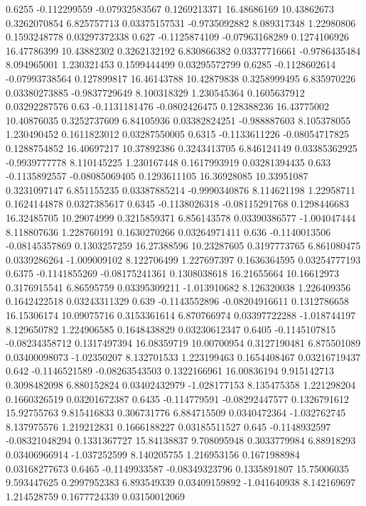 {0.6255 -0.112299559 -0.07932583567 0.1269213371 16.48686169 10.43862673 0.3262070854 6.825757713 0.03375157531 -0.9735092882 8.089317348 1.22980806 0.1593248778 0.03297372338
0.627 -0.1125874109 -0.07963168289 0.1274106926 16.47786399 10.43882302 0.3262132192 6.830866382 0.03377716661 -0.9786435484 8.094965001 1.230321453 0.1599444499 0.03295572799
0.6285 -0.1128602614 -0.07993738564 0.127899817 16.46143788 10.42879838 0.3258999495 6.835970226 0.03380273885 -0.9837729649 8.100318329 1.230545364 0.1605637912 0.03292287576
0.63 -0.1131181476 -0.0802426475 0.128388236 16.43775002 10.40876035 0.3252737609 6.84105936 0.03382824251 -0.988887603 8.105378055 1.230490452 0.1611823012 0.03287550005
0.6315 -0.1133611226 -0.08054717825 0.1288754852 16.40697217 10.37892386 0.3243413705 6.846124149 0.03385362925 -0.9939777778 8.110145225 1.230167448 0.1617993919 0.03281394435
0.633 -0.1135892557 -0.08085069405 0.1293611105 16.36928085 10.33951087 0.3231097147 6.851155235 0.03387885214 -0.9990340876 8.114621198 1.22958711 0.1624144878 0.0327385617
0.6345 -0.1138026318 -0.08115291768 0.1298446683 16.32485705 10.29074999 0.3215859371 6.856143578 0.03390386577 -1.004047444 8.118807636 1.228760191 0.1630270266 0.03264971411
0.636 -0.1140013506 -0.08145357869 0.1303257259 16.27388596 10.23287605 0.3197773765 6.861080475 0.0339286264 -1.009009102 8.122706499 1.227697397 0.1636364595 0.03254777193
0.6375 -0.1141855269 -0.08175241361 0.1308038618 16.21655664 10.16612973 0.3176915541 6.86595759 0.03395309211 -1.013910682 8.126320038 1.226409356 0.1642422518 0.03243311329
0.639 -0.1143552896 -0.08204916611 0.1312786658 16.15306174 10.09075716 0.3153361614 6.870766974 0.03397722288 -1.018744197 8.129650782 1.224906585 0.1648438829 0.03230612347
0.6405 -0.1145107815 -0.08234358712 0.1317497394 16.08359719 10.00700954 0.3127190481 6.875501089 0.03400098073 -1.02350207 8.132701533 1.223199463 0.1654408467 0.03216719437
0.642 -0.1146521589 -0.08263543503 0.1322166961 16.00836194 9.915142713 0.3098482098 6.880152824 0.03402432979 -1.028177153 8.135475358 1.221298204 0.1660326519 0.03201672387
0.6435 -0.114779591 -0.08292447577 0.1326791612 15.92755763 9.815416833 0.306731776 6.884715509 0.0340472364 -1.032762745 8.137975576 1.219212831 0.1666188227 0.03185511527
0.645 -0.1148932597 -0.08321048294 0.1331367727 15.84138837 9.708095948 0.3033779984 6.88918293 0.03406966914 -1.037252599 8.140205755 1.216953156 0.1671988984 0.03168277673
0.6465 -0.1149933587 -0.08349323796 0.1335891807 15.75006035 9.593447625 0.2997952383 6.893549339 0.03409159892 -1.041640938 8.142169697 1.214528759 0.1677724339 0.03150012069
}
